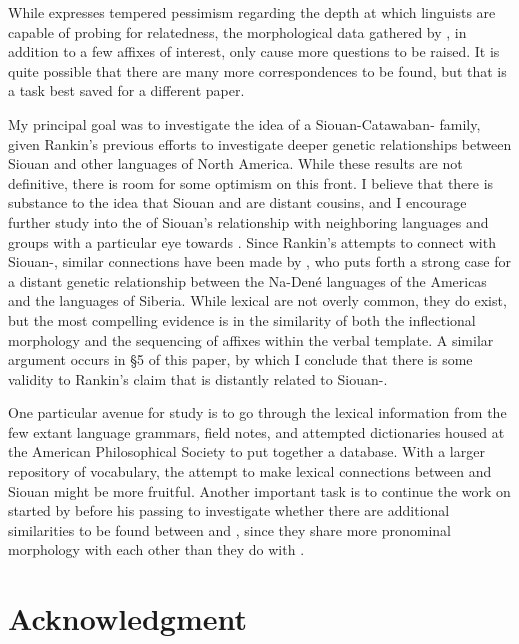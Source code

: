 \documentclass[output=paper]{LSP/langsci}
\begin{document}
While \citet{Rankin1996} expresses tempered pessimism regarding the depth at which linguists are capable of probing for relatedness, the morphological data gathered by \citet{Rankin1998scy}, in addition to a few affixes of interest, only cause more questions to be raised. It is quite possible that there are many more correspondences to be found, but that is a task best saved for a different paper.

My principal goal was to investigate the idea of a Siouan-Catawaban- family, given Rankin's \citeyear{Rankin1996,Rankin1998scy} previous efforts to investigate deeper genetic relationships between Siouan and other languages of North America. While these results are not definitive, there is room for some optimism on this front. I believe that there is substance to the idea that Siouan and  are distant cousins, and I encourage further study into the  of Siouan's relationship with neighboring languages and groups with a particular eye towards . Since Rankin's attempts to connect  with Siouan-, similar connections have been made by \citet{Vajda2010}, who puts forth a strong case for a distant genetic relationship between the Na-Den\'e languages of the Americas and the  languages of Siberia. While lexical  are not overly common, they do exist, but the most compelling evidence is in the similarity of both the inflectional morphology and the sequencing of affixes within the verbal template. A similar argument occurs in \S5 of this paper, by which I conclude that there is some validity to Rankin's claim that  is distantly related to Siouan-.

One particular avenue for study is to go through the lexical information from the few extant  language grammars, field notes, and attempted dictionaries housed at the American Philosophical Society to put together a  database. With a larger repository of  vocabulary, the attempt to make lexical connections between  and Siouan might be more fruitful. Another important task is to continue the work on  started by \citet{Rudes2007} before his passing to investigate whether there are additional similarities to be found between  and , since they share more pronominal morphology with each other than they do with .

\section*{Acknowledgment}
\end{document}

